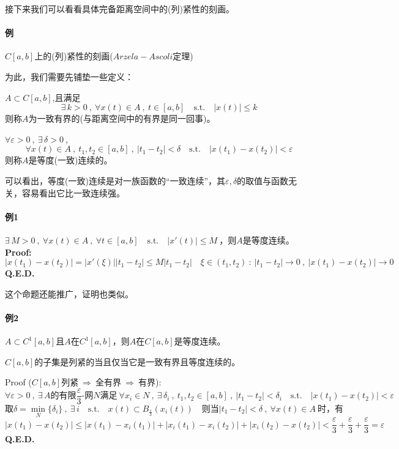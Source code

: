 接下来我们可以看看具体完备距离空间中的(列)紧性的刻画。

\paragraph*{例} \quad $C[a,b]$上的(列)紧性的刻画($Arzela-Ascoli$定理)

为此，我们需要先铺垫一些定义：
\begin{definition}[一致有界]
    $A \subset C[a,b]$,且满足
    \[\exists \, k>0 \ , \ \forall x(t) \in A \ , \ t \in [a,b] \quad \text{s.t.} \quad |x(t)| \leq k\]
    则称$A$为一致有界的(与距离空间中的有界是同一回事)。
\end{definition}
\begin{definition}[等度(一致)连续]
    $\forall \varepsilon>0 \ , \ \exists \, \delta>0 \ $,
    \[\forall x(t) \in A \ , \ t_1,t_2 \in [a,b] \ , \ |t_1-t_2|<\delta \quad \text{s.t.} \quad |x(t_1)-x(t_2)|<\varepsilon\]
    则称$A$是等度(一致)连续的。
\end{definition}
可以看出，等度(一致)连续是对一族函数的“一致连续”，其$\varepsilon,\delta$的取值与函数无关，容易看出它比一致连续强。

\paragraph*{例1} \quad $\exists \, M>0 \ , \ \forall x(t) \in A \ , \ \forall t \in [a,b] \quad \text{s.t.} \quad |x'(t)| \leq M \ $，则$A$是等度连续。\\
\textbf{Proof:}
\[|x(t_1)-x(t_2)|=|x'(\xi)||t_1-t_2| \leq M|t_1-t_2| \quad \xi \in (t_1,t_2) \ : \ |t_1-t_2| \to 0 \ , \ |x(t_1)-x(t_2)| \to 0\]
\textbf{Q.E.D.}

这个命题还能推广，证明也类似。

\paragraph*{例2} \quad $A \subset C^1[a,b]$且$A$在$C^1[a,b]$，则$A$在$C[a,b]$是等度连续。
\begin{theorem} \label{the:AA}
    $C[a,b]$的子集是列紧的当且仅当它是一致有界且等度连续的。
\end{theorem}
Proof ($C[a,b]$列紧$ \ \Rightarrow \ $全有界$ \ \Rightarrow \ $有界):
\[\forall \varepsilon>0 \ , \ \exists \, A\text{的有限}\frac{\varepsilon}{3}\text{-网}N\text{满足} \ \forall x_i \in N \ , \ \exists \,\delta_i \ , \ t_1,t_2 \in [a,b] \ , \ |t_1-t_2|<\delta_i \quad \text{s.t.} \quad |x(t_1)-x(t_2)|<\varepsilon\]
\[\text{取}\delta=\mathop \text{min}\limits_{N}\{\delta_i\} \ , \ \exists \, i \quad \text{s.t.} \quad x(t) \subset B_{\frac{\varepsilon}{3}}(x_i(t)) \quad \text{则当}|t_1-t_2|<\delta \ , \ \forall x(t) \in A \ \text{时，有}\]
\[|x(t_1)-x(t_2)| \leq |x(t_1)-x_i(t_1)|+|x_i(t_1)-x_i(t_2)|+|x_i(t_2)-x(t_2)|<\frac{\varepsilon}{3}+\frac{\varepsilon}{3}+\frac{\varepsilon}{3}=\varepsilon\]
\textbf{Q.E.D.}

